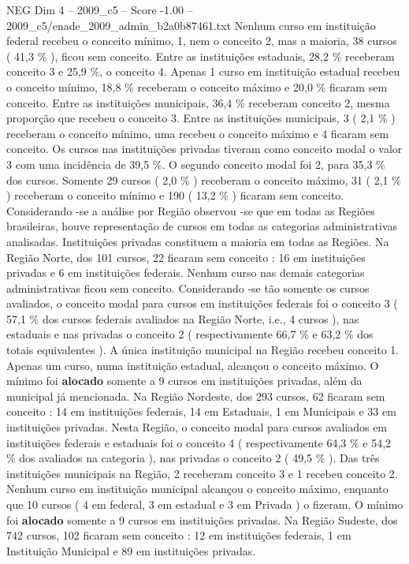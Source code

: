 \begin{textsample}{NEG Dim 4 – 2009\_c5 – Score -1.00 – 2009\_c5/enade\_2009\_admin\_b2a0b87461.txt}
Nenhum curso em instituição federal recebeu o conceito mínimo, 1, nem o conceito 2, mas a maioria, 38 cursos ( 41,3 \% ), ficou sem conceito.
Entre as instituições estaduais, 28,2 \% receberam conceito 3 e 25,9 \%, o conceito 4.
Apenas 1 curso em instituição estadual recebeu o conceito mínimo, 18,8 \% receberam o conceito máximo e 20,0 \% ficaram sem conceito.
Entre as instituições municipais, 36,4 \% receberam conceito 2, mesma proporção que recebeu o conceito 3.
Entre as instituições municipais, 3 ( 2,1 \% ) receberam o conceito mínimo, uma recebeu o conceito máximo e 4 ficaram sem conceito.
Os cursos nas instituições privadas tiveram como conceito modal o valor 3 com uma incidência de 39,5 \%.
O segundo conceito modal foi 2, para 35,3 \% dos cursos.
Somente 29 cursos ( 2,0 \% ) receberam o conceito máximo, 31 ( 2,1 \% ) receberam o conceito mínimo e 190 ( 13,2 \% ) ficaram sem conceito.
Considerando -se a análise por Região observou -se que em todas as Regiões brasileiras, houve representação de cursos em todas as categorias administrativas analisadas.
Instituições privadas constituem a maioria em todas as Regiões.
Na Região Norte, dos 101 cursos, 22 ficaram sem conceito : 16 em instituições privadas e 6 em instituições federais.
Nenhum curso nas demais categorias administrativas ficou sem conceito.
Considerando -se tão somente os cursos avaliados, o conceito modal para cursos em instituições federais foi o conceito 3 ( 57,1 \% dos cursos federais avaliados na Região Norte, i.e., 4 cursos ), nas estaduais e nas privadas o conceito 2 ( respectivamente 66,7 \% e 63,2 \% dos totais equivalentes ).
A única instituição municipal na Região recebeu conceito 1.
Apenas um curso, numa instituição estadual, alcançou o conceito máximo.
O mínimo foi \textbf{alocado} somente a 9 cursos em instituições privadas, além da municipal já mencionada.
Na Região Nordeste, dos 293 cursos, 62 ficaram sem conceito : 14 em instituições federais, 14 em Estaduais, 1 em Municipais e 33 em instituições privadas.
Nesta Região, o conceito modal para cursos avaliados em instituições federais e estaduais foi o conceito 4 ( respectivamente 64,3 \% e 54,2 \% dos avaliados na categoria ), nas privadas o conceito 2 ( 49,5 \% ).
Das três instituições municipais na Região, 2 receberam conceito 3 e 1 recebeu conceito 2.
Nenhum curso em instituição municipal alcançou o conceito máximo, enquanto que 10 cursos ( 4 em federal, 3 em estadual e 3 em Privada ) o fizeram.
O mínimo foi \textbf{alocado} somente a 9 cursos em instituições privadas.
Na Região Sudeste, dos 742 cursos, 102 ficaram sem conceito : 12 em instituições federais, 1 em Instituição Municipal e 89 em instituições privadas.

\end{textsample}
